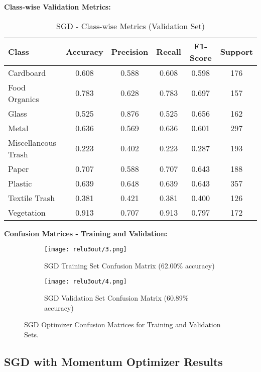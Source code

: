 \documentclass[12pt,a4paper]{article}
\begin{document}
\textbf{Class-wise Validation Metrics:}

\begin{table}[H]
\centering
\caption{SGD - Class-wise Metrics (Validation Set)}
\begin{tabular}{lccccc}
\toprule
\textbf{Class} & \textbf{Accuracy} & \textbf{Precision} & \textbf{Recall} & \textbf{F1-Score} & \textbf{Support} \\
\midrule
Cardboard & 0.608 & 0.588 & 0.608 & 0.598 & 176 \\
Food Organics & 0.783 & 0.628 & 0.783 & 0.697 & 157 \\
Glass & 0.525 & 0.876 & 0.525 & 0.656 & 162 \\
Metal & 0.636 & 0.569 & 0.636 & 0.601 & 297 \\
Miscellaneous Trash & 0.223 & 0.402 & 0.223 & 0.287 & 193 \\
Paper & 0.707 & 0.588 & 0.707 & 0.643 & 188 \\
Plastic & 0.639 & 0.648 & 0.639 & 0.643 & 357 \\
Textile Trash & 0.381 & 0.421 & 0.381 & 0.400 & 126 \\
Vegetation & 0.913 & 0.707 & 0.913 & 0.797 & 172 \\
\bottomrule
\end{tabular}
\end{table}

\textbf{Confusion Matrices - Training and Validation:}

\begin{figure}[H]
\centering
\begin{subfigure}[b]{0.48\textwidth}
    \centering
    \texttt{[image: relu3out/3.png]}
    \caption{SGD Training Set Confusion Matrix (62.00\% accuracy)}
    \label{fig:sgd_confmat_train}
\end{subfigure}
\hfill
\begin{subfigure}[b]{0.48\textwidth}
    \centering
    \texttt{[image: relu3out/4.png]}
    \caption{SGD Validation Set Confusion Matrix (60.89\% accuracy)}
    \label{fig:sgd_confmat_val}
\end{subfigure}
\caption{SGD Optimizer Confusion Matrices for Training and Validation Sets.}
\label{fig:sgd_confmat_comparison}
\end{figure}

\subsection{SGD with Momentum Optimizer Results}
\end{document}
